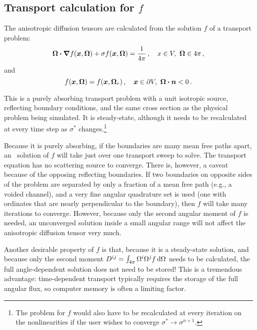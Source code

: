 \subsection{Transport calculation for $f$}

The anisotropic diffusion tensors are calculated from the solution $f$ of a
transport problem:
\begin{equation*}
    \bm{\Omega}\bm{\cdot} \bm{\nabla} f(\bm{x}, \bm{\Omega})
    + \sigma f (\bm{x}, \bm{\Omega})
  = \frac{1}{4\pi} \,, \quad x \in V,\ \bm{\Omega} \in 4\pi\,,
\end{equation*}
and
\begin{equation*}
  f(\bm{x}, \bm{\Omega}) = f(\bm{x}, \bm{\Omega}_r) \,,
 \quad \bm{x} \in \partial V, \ \bm{\Omega} \bm{\cdot} \bm{n} < 0\,.
\end{equation*}

This is a purely absorbing transport problem with a unit isotropic source,
reflecting boundary conditions, and the same cross section as the physical problem
being simulated. It is steady-state, although it needs to be recalculated at
every time step as $\sigma^*$ changes.\footnote{The problem for $f$ would also
have to be recalculated at every iteration on the nonlinearities if the user
wishes to converge $\sigma^* \to \sigma^{n+1}$.}

Because it is purely absorbing, if the boundaries are many mean free paths
apart, an \SN\ solution of $f$ will take just over one transport sweep to
solve.
The transport equation has no scattering source to converge.
There is, however, a caveat because of the opposing reflecting boundaries. If
two boundaries on opposite sides of the problem are separated by only a
fraction of a mean free path (e.g., a voided channel), and a very fine angular
quadrature set is used (one with ordinates that are nearly perpendicular to the
boundary), then $f$ will take many iterations to converge.
However, because only the second angular moment of $f$ is needed, an
unconverged solution inside a small angular range will not affect the
anisotropic diffusion tensor very much.

Another desirable property of $f$ is that, because it is a steady-state
solution, and because only the second moment
$D^{ij}=\int_{4\pi} \Omega^i \Omega^j f \mathop{}\!\mathrm{d}\Omega$ needs to be calculated, the
full angle-dependent solution does not need to be stored! This is a tremendous
advantage: time-dependent transport typically requires the storage of the full
angular flux, so computer memory is often a limiting factor.

